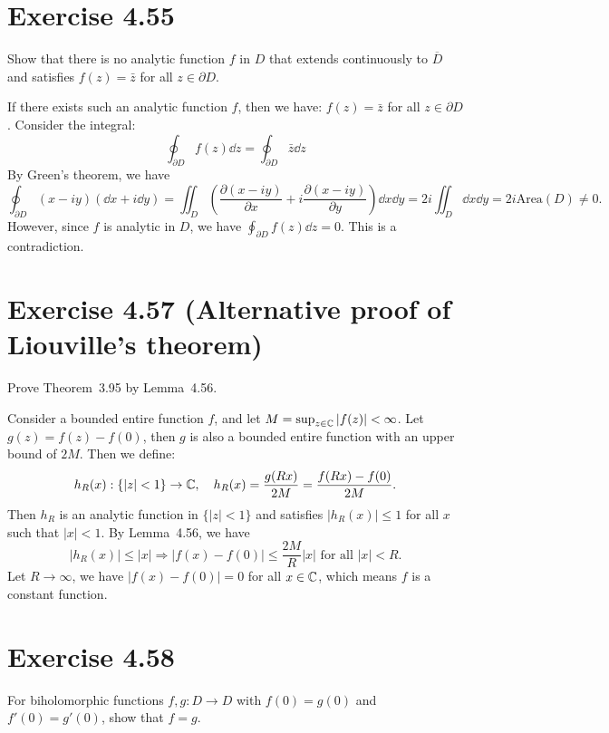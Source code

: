 \documentclass{article}
\begin{document}
\section{Exercise 4.55}

Show that there is no analytic function $f$ in $D$ that extends
continuously to $\overline{D}$ and satisfies $f(z) = \bar{z}$ for all
$z \in \partial D$.

\begin{solution}
  If there exists such an analytic function $f$, then we have: $f(z)
  = \bar{z}$ for all $z \in \partial D$. Consider the integral:
  \[
    \oint_{\partial D} f(z) \dd z = \oint_{\partial D} \bar{z} \dd z
  \]
  By Green's theorem, we have
  \[
    \oint_{\partial D} (x-iy)(\dd x + i \dd y) = \iint_D
    \left(\frac{\partial (x-iy)}{\partial x} + i \frac{\partial
    (x-iy)}{\partial y}\right) \dd x \dd y = 2i \iint_D \dd x \dd y =
    2i\text{Area}(D) \ne 0.
  \]
  However, since $f$ is analytic in $D$, we have $\oint_{\partial D}
  f(z) \dd z = 0$. This is a contradiction.
\end{solution}

\section{Exercise 4.57 (Alternative proof of Liouville's theorem)}

Prove Theorem~3.95 by Lemma~4.56.

\begin{solution}
  Consider a bounded entire function $f$, and let $M = \sup_{z \in
  \mathbb{C}} |f(z)| < \infty$. Let $g(z) = f(z) - f(0)$, then $g$ is also a
  bounded entire function with an upper bound of $2M$. Then we define:
  \[
    h_R(x): \{|z| < 1\} \to \mathbb{C}, \quad h_R(x) = \frac{g(Rx)}{2M} =
    \frac{f(Rx) - f(0)}{2M}.
  \]
  Then $h_R$ is an analytic function in $\{|z| < 1\}$ and satisfies
  $|h_R(x)| \le 1$ for all $x$ such that $|x| < 1$. By Lemma~4.56, we have
  \[
    |h_R(x)| \leq |x| \Rightarrow |f(x) - f(0)| \leq \frac{2M}{R} |x|
    \text{ for all } |x| < R.
  \]
  Let $R \to \infty$, we have $|f(x) - f(0)| = 0$ for all $x \in \mathbb{C}$,
  which means $f$ is a constant function.
\end{solution}

\section{Exercise 4.58}

For biholomorphic functions $f, g : D \to D$ with $f(0) = g(0)$ and
$f'(0) = g'(0)$, show that $f = g$.
\end{document}

